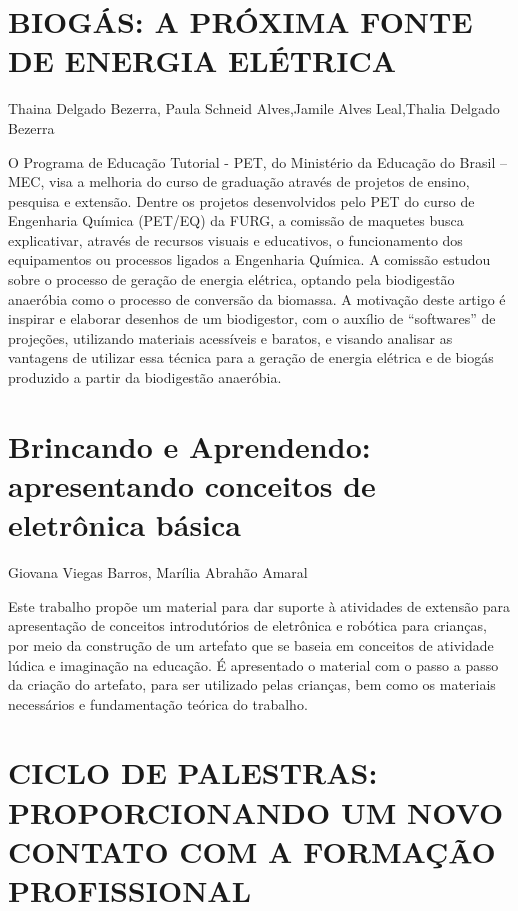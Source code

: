 

\section{BIOGÁS: A PRÓXIMA FONTE DE ENERGIA ELÉTRICA}

Thaina Delgado Bezerra, Paula Schneid Alves,Jamile Alves Leal,Thalia Delgado Bezerra

O Programa de Educação Tutorial - PET, do Ministério da Educação do Brasil – MEC, visa a melhoria do curso de graduação através de projetos de ensino, pesquisa e extensão. Dentre os projetos desenvolvidos pelo PET do curso de Engenharia Química (PET/EQ) da FURG, a comissão de maquetes busca explicativar, através de recursos visuais e educativos, o funcionamento dos equipamentos ou processos ligados a Engenharia Química. A comissão estudou sobre o processo de geração de energia elétrica, optando pela biodigestão anaeróbia como o processo de conversão da biomassa. A motivação deste artigo é inspirar e elaborar desenhos de um biodigestor, com o auxílio de “softwares” de projeções, utilizando materiais acessíveis e baratos, e visando analisar as vantagens de utilizar essa técnica para a geração de energia elétrica e de biogás produzido a partir da biodigestão anaeróbia.




\section{Brincando e Aprendendo: apresentando conceitos de eletrônica básica}

Giovana Viegas Barros, Marília Abrahão Amaral

Este trabalho propõe um material para dar suporte à atividades de extensão para apresentação de conceitos introdutórios de eletrônica e robótica para crianças, por meio da construção de um artefato que se baseia em conceitos de atividade lúdica e imaginação na educação. É apresentado o material com o passo a passo da criação do artefato, para ser utilizado pelas crianças, bem como os materiais necessários e fundamentação teórica do trabalho.



\section{CICLO DE PALESTRAS: PROPORCIONANDO UM NOVO CONTATO COM A FORMAÇÃO PROFISSIONAL}

